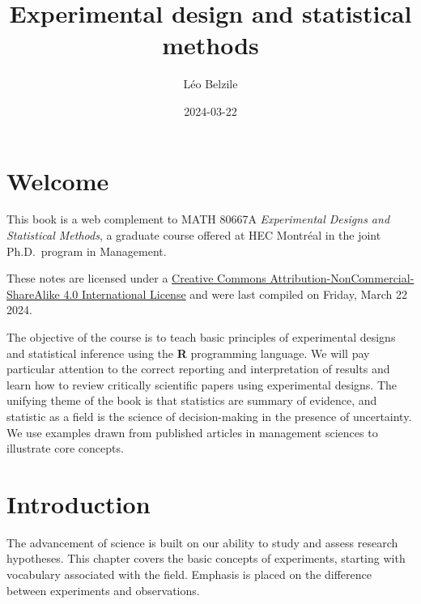 \documentclass[
  11pt,
  letterpaper,
]{scrbook}
\title{Experimental design and statistical methods}
\author{Léo Belzile}
\date{2024-03-22}
\renewcommand*\contentsname{Table of contents}
\newcommand\contentsname{Table of contents}
\theoremstyle{definition}
\theoremstyle{remark}
\begin{document}


\ifdefined\Shaded\renewenvironment{Shaded}{\begin{tcolorbox}[enhanced, interior hidden, borderline west={3pt}{0pt}{shadecolor}, sharp corners, boxrule=0pt, frame hidden, breakable]}{\end{tcolorbox}}\fi

\renewcommand*\contentsname{Table of contents}
{
\setcounter{tocdepth}{2}
\tableofcontents
}
\mainmatter
{}

\hypertarget{welcome}{%
\chapter*{Welcome}\label{welcome}}


This book is a web complement to MATH 80667A \emph{Experimental Designs
and Statistical Methods}, a graduate course offered at HEC Montréal in
the joint Ph.D.~program in Management.

These notes are licensed under a
\href{http://creativecommons.org/licenses/by-nc-sa/4.0/}{Creative
Commons Attribution-NonCommercial-ShareAlike 4.0 International License}
and were last compiled on Friday, March 22 2024.

The objective of the course is to teach basic principles of experimental
designs and statistical inference using the \textbf{R} programming
language. We will pay particular attention to the correct reporting and
interpretation of results and learn how to review critically scientific
papers using experimental designs. The unifying theme of the book is
that statistics are summary of evidence, and statistic as a field is the
science of decision-making in the presence of uncertainty. We use
examples drawn from published articles in management sciences to
illustrate core concepts.


\hypertarget{introduction}{%
\chapter{Introduction}\label{introduction}}

The advancement of science is built on our ability to study and assess
research hypotheses. This chapter covers the basic concepts of
experiments, starting with vocabulary associated with the field.
Emphasis is placed on the difference between experiments and
observations.
\end{document}
